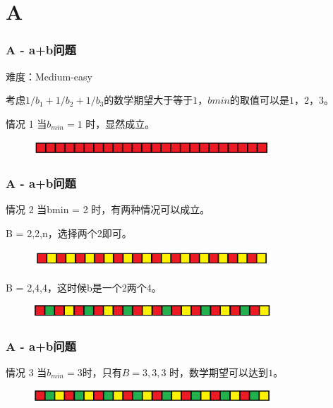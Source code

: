 \section{A}
\begin{frame}
\frametitle{A - a+b问题}
难度：Medium-easy

考虑$1/b_1 + 1/b_2 + 1/b_3$的数学期望大于等于$1$，$bmin$的取值可以是$1$，$2$，$3$。

\begin{block}{情况 1}
当$b_{min} = 1$ 时，显然成立。
\begin{figure}[H]
    \centering
    \includegraphics[width=24em]{./solution/src/A1.png}
\end{figure}
\end{block}

\end{frame}

\begin{frame}
\frametitle{A - a+b问题}
\begin{block}{情况 2}
当bmin = 2 时，有两种情况可以成立。

B = {2,2,n}，选择两个2即可。

\begin{figure}[H]
    \centering
    \includegraphics[width=24em]{./solution/src/A2.png}
\end{figure}

B = {2,4,4}，这时候b是一个2两个4。

\begin{figure}[H]
    \centering
    \includegraphics[width=24em]{./solution/src/A3.png}
\end{figure}
\end{block}
\end{frame}

\begin{frame}
\frametitle{A - a+b问题}
\begin{block}{情况 3}
当$b_{min} = 3$时，只有$B = {3,3,3}$ 时，数学期望可以达到$1$。

\begin{figure}[H]
    \centering
    \includegraphics[width=24em]{./solution/src/A4.png}
\end{figure}
\end{block}

\end{frame}